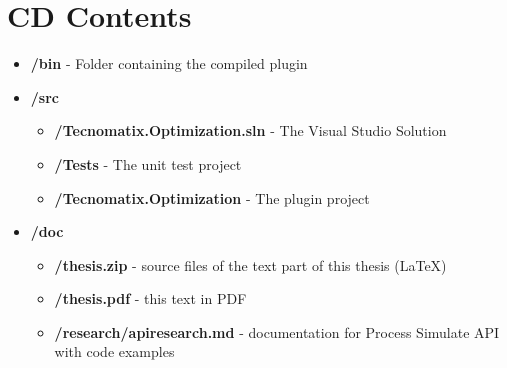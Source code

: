 \chapter{CD Contents}
\label{ch:cdcontents}

\begin{itemize}
\item \textbf{/bin} - Folder containing the compiled plugin

\item \textbf{/src}
    \begin{itemize}
    \item \textbf{/Tecnomatix.Optimization.sln} - The Visual Studio Solution
    \item \textbf{/Tests} - The unit test project
    \item \textbf{/Tecnomatix.Optimization} - The plugin project
    \end{itemize}

\item \textbf{/doc}
    \begin{itemize}
    \item \textbf{/thesis.zip} - source files of the text part of this thesis (\LaTeX)
    \item \textbf{/thesis.pdf} - this text in PDF
    \item \textbf{/research/apiresearch.md} - documentation for Process Simulate API with code examples 
    \end{itemize}



\end{itemize}